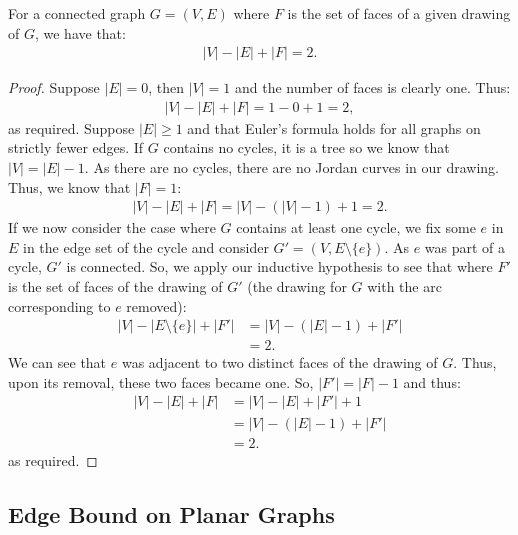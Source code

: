 For a connected graph $G = (V, E)$ where $F$ is the set of faces of a given 
drawing of $G$, we have that: \begin{gather*}
  |V| - |E| + |F| = 2.
\end{gather*}
\begin{proof}
    Suppose $|E| = 0$, then $|V| = 1$ and the number of faces is clearly one.
    Thus: \begin{gather*}
        |V| - |E| + |F| = 1 - 0 + 1 = 2,
    \end{gather*} as required.
    Suppose $|E| \geq 1$ and that Euler's formula holds for all graphs
    on strictly fewer edges. If $G$ contains no cycles, it is a tree so
    we know that $|V| = |E| - 1$. As there are no cycles, there are no
    Jordan curves in our drawing. Thus, we know that $|F| = 1$: \begin{gather*}
        |V| - |E| + |F| = |V| - (|V| - 1) + 1 = 2.
    \end{gather*} If we now consider the case where $G$ contains at least one cycle,
    we fix some $e$ in $E$ in the edge set of the cycle and consider 
    $G' = (V, E \setminus \{e\})$. As $e$ was part of a cycle, $G'$ is connected.
    So, we apply our inductive hypothesis to see that where $F'$ is the set
    of faces of the drawing of $G'$ (the drawing for $G$ with the arc
    corresponding to $e$ removed): \begin{align*}
        |V| - |E \setminus \{e\}| + |F'| &=
        |V| - (|E| - 1) + |F'| \\
        &= 2.
    \end{align*} We can see that $e$ was adjacent to two distinct faces of the drawing
    of $G$. Thus, upon its removal, these two faces became one. So, $|F'| = |F| - 1$
    and thus: \begin{align*}
        |V| - |E| + |F| &= |V| - |E| + |F'| + 1 \\
        &= |V| - (|E| - 1) + |F'| \\
        &= 2.
    \end{align*} as required.
\end{proof}

\subsection{Edge Bound on Planar Graphs}

